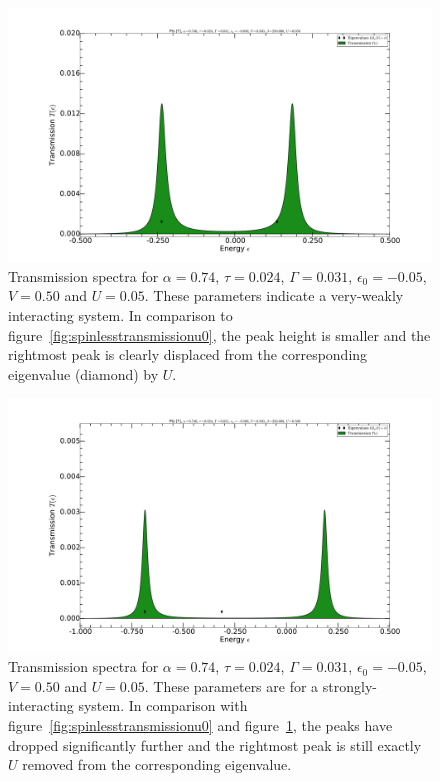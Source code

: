 \begin{figure}[!bt]
    \centering
    \includegraphics[height=.35\textheight,clip=true,trim=7cm 2cm 7cm 4cm]{pdf/trans/decospinlesstransmissionarbitraryu1.pdf}
    \caption{Transmission spectra for $\alpha=0.74$, $\tau=0.024$, $\Gamma=0.031$, $\epsilon_0 = - 0.05$, $V=0.50$ and $U=0.05$. These parameters indicate a very-weakly interacting system. In comparison to figure~\ref{fig:spinlesstransmissionu0}, the peak height is smaller and the rightmost peak is clearly displaced from the corresponding eigenvalue (diamond) by $U$. }
    \label{fig:spinlesstransmissionu1}
\end{figure}
\begin{figure}[!bt]
    \centering
    \includegraphics[height=.35\textheight,clip=true,trim=7cm 2cm 7cm 4cm]{pdf/trans/decospinlesstransmissionarbitraryu4.pdf}
    \caption{Transmission spectra for $\alpha=0.74$, $\tau=0.024$, $\Gamma=0.031$, $\epsilon_0 = - 0.05$, $V=0.50$ and $U=0.05$. These parameters are for a strongly-interacting system. In comparison with figure~\ref{fig:spinlesstransmissionu0} and figure~\ref{fig:spinlesstransmissionu1}, the peaks have dropped significantly further and the rightmost peak is still exactly $U$ removed from the corresponding eigenvalue.}
    \label{fig:spinlesstransmissionu4}
\end{figure}

